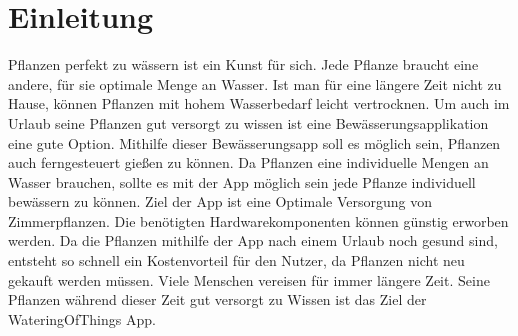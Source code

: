 \section{Einleitung}
Pflanzen perfekt zu wässern ist ein Kunst für sich. Jede Pflanze braucht eine andere, für sie optimale Menge an Wasser. Ist man für eine längere Zeit nicht zu Hause, können Pflanzen mit hohem Wasserbedarf leicht vertrocknen. Um auch im Urlaub seine Pflanzen gut versorgt zu wissen ist eine Bewässerungsapplikation eine gute Option. Mithilfe dieser Bewässerungsapp soll es möglich sein, Pflanzen auch ferngesteuert gießen zu können. Da Pflanzen eine individuelle Mengen an Wasser brauchen, sollte es mit der App möglich sein jede Pflanze individuell bewässern zu können. Ziel der App ist eine Optimale Versorgung von Zimmerpflanzen. Die benötigten Hardwarekomponenten können günstig erworben werden. Da die Pflanzen mithilfe der App nach einem Urlaub noch gesund sind, entsteht so schnell ein Kostenvorteil für den Nutzer, da Pflanzen nicht neu gekauft werden müssen. Viele Menschen vereisen für immer längere Zeit. Seine Pflanzen während dieser Zeit gut versorgt zu Wissen ist das Ziel der WateringOfThings App.